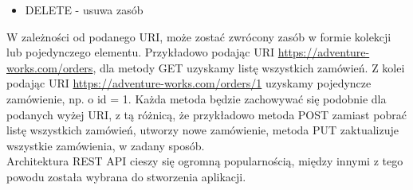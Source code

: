 \documentclass[12pt]{article}
\begin{document}
\begin{sloppypar}
{{\begin{itemize}
      \item DELETE - usuwa zasób
    \end{itemize}
    W zależności od podanego URI, może zostać zwrócony zasób w formie kolekcji lub pojedynczego elementu. 
    Przykładowo podając URI \url{https://adventure-works.com/orders}, dla metody GET uzyskamy listę wszystkich zamówień. 
    Z kolei podając URI \url{https://adventure-works.com/orders/1} uzyskamy pojedyncze zamówienie, np. o id = 1.
    Każda metoda będzie zachowywać się podobnie dla podanych wyżej URI, z tą różnicą, że przykładowo metoda POST zamiast pobrać listę wszystkich zamówień, utworzy nowe zamówienie, 
    metoda PUT zaktualizuje wszystkie zamówienia, w zadany sposób.\\
    Architektura REST API cieszy się ogromną popularnością, między innymi z tego powodu została wybrana do stworzenia aplikacji.
  }
}
\end{sloppypar}
\end{document}
